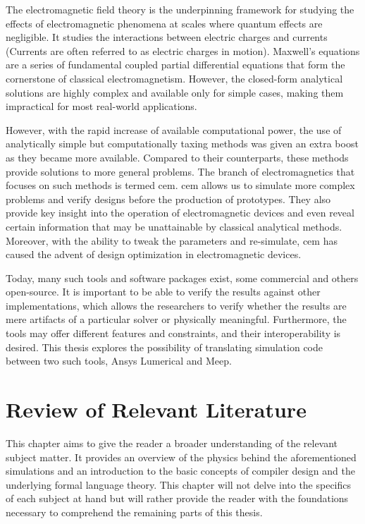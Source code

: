 The electromagnetic field theory is the underpinning framework for studying the effects of electromagnetic phenomena at scales where quantum effects are negligible. It studies the interactions between electric charges and currents (Currents are often referred to as electric charges in motion). Maxwell's equations are a series of fundamental coupled partial differential equations that form the cornerstone of classical electromagnetism. However, the closed-form analytical solutions are highly complex and available only for simple cases, making them impractical for most real-world applications.


However, with the rapid increase of available computational power, the use of analytically simple but computationally taxing methods was given an extra boost as they became more available. Compared to their counterparts, these methods provide solutions to more general problems. The branch of electromagnetics that focuses on such methods is termed \gls{cem}. \gls{cem} allows us to simulate more complex problems and verify designs before the production of prototypes. They also provide key insight into the operation of electromagnetic devices and even reveal certain information that may be unattainable by classical analytical methods. Moreover, with the ability to tweak the parameters and re-simulate, \gls{cem} has caused the advent of design optimization in electromagnetic devices.


Today, many such tools and software packages exist, some commercial and others open-source. It is important to be able to verify the results against other implementations, which allows the researchers to verify whether the results are mere artifacts of a particular solver or physically meaningful. Furthermore, the tools may offer different features and constraints, and their interoperability is desired. This thesis explores the possibility of translating simulation code between two such tools, Ansys Lumerical and Meep.


  
  

\chapter{Review of Relevant Literature}
This chapter aims to give the reader a broader understanding of the relevant subject matter. It provides an overview of the physics behind the aforementioned simulations and an introduction to the basic concepts of compiler design and the underlying formal language theory. This chapter will not delve into the specifics of each subject at hand but will rather provide the reader with the foundations necessary to comprehend the remaining parts of this thesis.

